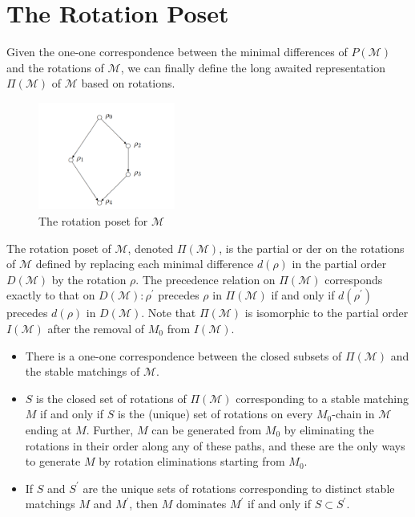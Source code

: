 \section{The Rotation Poset} 

Given the one-one correspondence between the minimal differences of $P(\mathcal{M})$ and the rotations of $\mathcal{M}$, we can finally define the long awaited representation $\Pi(\mathcal{M})$ of $\mathcal{M}$ based on rotations.

\begin{figure}[ht]
  \centering
  \includegraphics[width=0.4\textwidth]{IMAGES_FIGS/FIG_2_8.png}
  \caption{The rotation poset for $\mathcal{M}$}
  \label{FIG_3_10}
\end{figure}

The rotation poset of $\mathcal{M}$, denoted $\Pi(\mathcal{M})$, is the partial or der on the rotations of $\mathcal{M}$ defined by replacing each minimal difference $d(\rho)$ in the partial order $D(\mathcal{M})$ by the rotation $\rho$. The precedence relation on $\Pi(\mathcal{M})$ corresponds exactly to that on $D(\mathcal{M}): \rho^{\prime}$ precedes $\rho$ in $\Pi(\mathcal{M})$ if and only if $d\left(\rho^{\prime}\right)$ precedes $d(\rho)$ in $D(\mathcal{M})$. Note that $\Pi(\mathcal{M})$ is isomorphic to the partial order $I(\mathcal{M})$ after the removal of $M_0$ from $I(\mathcal{M})$.

\begin{theo}
    \begin{itemize}
        \item There is a one-one correspondence between the closed subsets of $\Pi(\mathcal{M})$ and the stable matchings of $\mathcal{M}$.
        \item $S$ is the closed set of rotations of $\Pi(\mathcal{M})$ corresponding to a stable matching $M$ if and only if $S$ is the (unique) set of rotations on every $M_0$-chain in $\mathcal{M}$ ending at $M$. Further, $M$ can be generated from $M_0$ by eliminating the rotations in their order along any of these paths, and these are the only ways to generate $M$ by rotation eliminations starting from $M_0$.
        \item If $S$ and $S^{\prime}$ are the unique sets of rotations corresponding to distinct stable matchings $M$ and $M^{\prime}$, then $M$ dominates $M^{\prime}$ if and only if $S \subset S^{\prime}$.
    \end{itemize}
\end{theo} 
